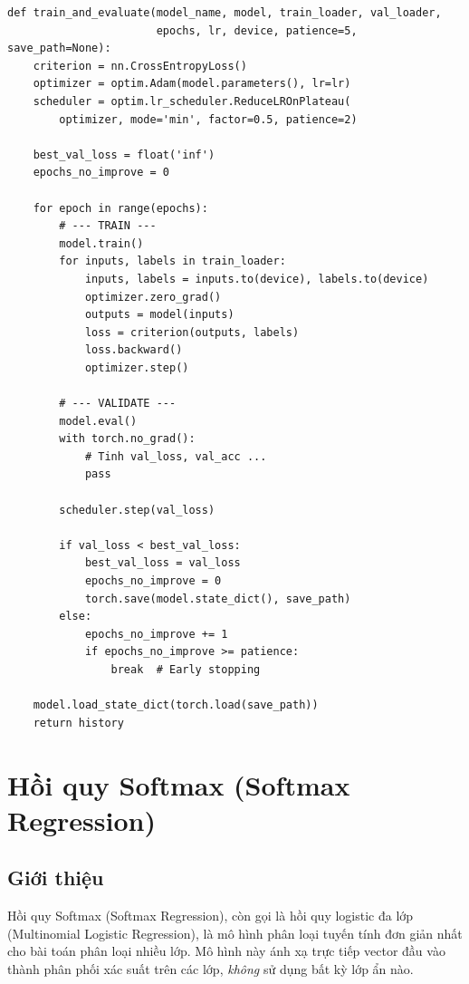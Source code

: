 \documentclass[a4paper]{article}
\theoremstyle{definition}
\begin{document}
\begin{verbatim}
def train_and_evaluate(model_name, model, train_loader, val_loader,
                       epochs, lr, device, patience=5, save_path=None):
    criterion = nn.CrossEntropyLoss()
    optimizer = optim.Adam(model.parameters(), lr=lr)
    scheduler = optim.lr_scheduler.ReduceLROnPlateau(
        optimizer, mode='min', factor=0.5, patience=2)

    best_val_loss = float('inf')
    epochs_no_improve = 0

    for epoch in range(epochs):
        # --- TRAIN ---
        model.train()
        for inputs, labels in train_loader:
            inputs, labels = inputs.to(device), labels.to(device)
            optimizer.zero_grad()
            outputs = model(inputs)
            loss = criterion(outputs, labels)
            loss.backward()
            optimizer.step()

        # --- VALIDATE ---
        model.eval()
        with torch.no_grad():
            # Tinh val_loss, val_acc ...
            pass

        scheduler.step(val_loss)

        if val_loss < best_val_loss:
            best_val_loss = val_loss
            epochs_no_improve = 0
            torch.save(model.state_dict(), save_path)
        else:
            epochs_no_improve += 1
            if epochs_no_improve >= patience:
                break  # Early stopping

    model.load_state_dict(torch.load(save_path))
    return history
\end{verbatim}

\section{Hồi quy Softmax (Softmax Regression)}

\subsection{Giới thiệu}
Hồi quy Softmax (Softmax Regression), còn gọi là hồi quy logistic đa lớp (Multinomial Logistic Regression), là mô hình phân loại tuyến tính đơn giản nhất cho bài toán phân loại nhiều lớp. Mô hình này ánh xạ trực tiếp vector đầu vào thành phân phối xác suất trên các lớp, \textit{không} sử dụng bất kỳ lớp ẩn nào.
\end{document}
